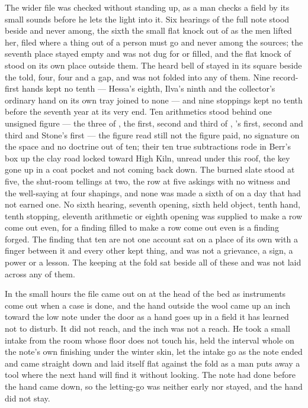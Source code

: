 The wider file was checked without standing up, as a man checks a field by its small sounds before he lets the light into it. Six hearings of the full note stood beside and never among, the sixth the small flat knock out of  as the men lifted her, filed where a thing out of a person must go and never among the sources; the seventh place stayed empty and was not dug for or filled, and the flat knock of  stood on its own place outside them. The heard bell of  stayed in its square beside the told, four, four and a gap, and was not folded into any of them. Nine record-first hands kept no tenth — Hessa's eighth, Ilva's ninth and the collector's ordinary hand on its own tray joined to none — and nine stoppings kept no tenth before the seventh year at its very end. Ten arithmetics stood behind one unsigned figure — the three of , the first, second and third of , 's first, second and third and Stone's first — the figure read still not the figure paid, no signature on the space and no doctrine out of ten; their ten true subtractions rode in Berr's box up the clay road locked toward High Kiln, unread under this roof, the key gone up in a coat pocket and not coming back down. The burned slate stood at five, the shut-room tellings at two, the row at five askings with no witness and the well-saying at four shapings, and none was made a sixth of on a day that had not earned one. No sixth hearing, seventh opening, sixth held object, tenth hand, tenth stopping, eleventh arithmetic or eighth opening was supplied to make a row come out even, for a finding filled to make a row come out even is a finding forged. The finding that ten are not one account sat on a place of its own with a finger between it and every other kept thing, and was not a grievance, a sign, a power or a lesson. The keeping at the fold sat beside all of these and was not laid across any of them.

\scenebreak

In the small hours the file came out on  at the head of the bed as instruments come out when a case is done, and the hand outside the wool came up an inch toward the low note under the door as a hand goes up in a field it has learned not to disturb. It did not reach, and the inch was not a reach. He took a small intake from the room whose floor does not touch his, held the interval whole on the note's own finishing under the winter skin, let the intake go as the note ended and came straight down and laid itself flat against the fold as a man puts away a tool where the next hand will find it without looking. The note had done before the hand came down, so the letting-go was neither early nor stayed, and the hand did not stay.

